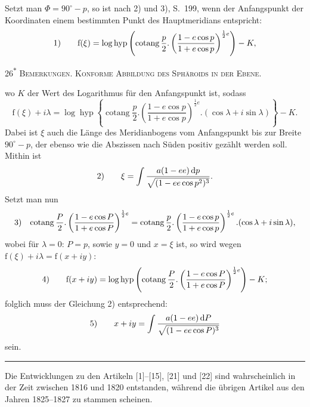 Setzt man $\Phi=90^\circ-p$, so ist nach 2) und 3), S.~199, wenn der Anfangspunkt der Koordinaten einem bestimmten Punkt des Hauptmeridians entspricht:
\[
\begin{array}{r@{\qquad}l}
1)&\displaystyle\mathrm f(\xi)=\log\operatorname{hyp}
\left(\operatorname{cotang}\frac p2.\left(\frac{1-e\cos p}{1+e\cos p}\right)^{\frac12e}\right)-K,
\end{array}
\]
\par\endgroup
\vfill\noindent\hfill26\textsuperscript{$\ast$}\hspace*{2cm}
\clearpage
{}\hfill\textsc{Bemerkungen. Konforme Abbildung des Sphäroids in der Ebene.}\par\medskip
\begingroup\footnotesize
wo $K$ der Wert des Logarithmus für den Anfangspunkt ist, sodass
\[
\mathrm f(\xi)+i\lambda=\log\operatorname{hyp}\left\{\operatorname{cotang}\frac p2.\left(\frac{1-e\cos p}{1+e\cos p}\right)^{\frac12e}.(\cos\lambda+i\sin\lambda)\right\}-K.
\]
Dabei ist $\xi$ auch die Länge des Meridianbogens vom Anfangspunkt bis zur Breite $90^\circ-p$, der ebenso wie die Abszissen nach Süden positiv gezählt werden soll. Mithin ist
\[
\begin{array}{r@{\qquad}l}
2)&\displaystyle\xi=\int\frac{a(1-ee)\,\mathrm dp}{\sqrt{(1-ee\cos p^2)^3}}.
\end{array}
\]
Setzt man nun
\[
\begin{array}{r@{\quad}l}
3)&\displaystyle\operatorname{cotang}\frac P2.\left(\frac{1-e\cos P}{1+e\cos P}\right)^{\frac12e}
=\operatorname{cotang}\frac p2.\left(\frac{1-e\cos p}{1+e\cos p}\right)^{\frac12e}.(\cos\lambda+i\sin\lambda),
\end{array}
\]
wobei für $\lambda=0$: $P=p$, sowie $y=0$ und $x=\xi$ ist, so wird wegen $\mathrm f(\xi)+i\lambda=\mathrm f(x+iy)$:
\[
\begin{array}{r@{\qquad}l}
4)&\displaystyle\mathrm f(x+iy)=\log\operatorname{hyp}\left(\operatorname{cotang}\frac P2.\left(\frac{1-e\cos P}{1+e\cos P}\right)^{\frac12e}\right)-K;
\end{array}
\]
folglich muss der Gleichung 2) entsprechend:
\[
\begin{array}{r@{\qquad}l}
5)&\displaystyle x+iy=\int\frac{a(1-ee)\,\mathrm dP}{\sqrt{(1-ee\cos P)^3}}
\end{array}
\]
sein.
\begin{center}\rule{4cm}{.4pt}\end{center}
\bigskip
Die Entwicklungen zu den Artikeln [1]--[15], [21] und [22] sind wahrscheinlich in der Zeit zwischen 1816 und 1820 entstanden, während die übrigen Artikel aus den Jahren 1825--1827 zu stammen scheinen.
